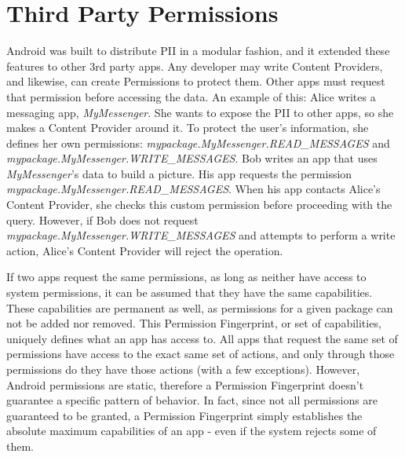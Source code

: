 \section{Third Party Permissions}
\begin{sloppypar}
Android was built to distribute PII in a modular fashion, and it extended these features to other 3rd party apps. Any developer may write Content Providers, and likewise, can create Permissions to protect them. Other apps must request that permission before accessing the data. An example of this: Alice writes a messaging app, \textit{MyMessenger}. She wants to expose the PII to other apps, so she makes a Content Provider around it. To protect the user's information, she defines her own permissions: \textit{mypackage.MyMessenger.READ\_MESSAGES} and \textit{mypackage.MyMessenger.WRITE\_MESSAGES}. Bob writes an app that uses \textit{MyMessenger}'s data to build a picture. His app requests the permission \textit{mypackage.MyMessenger.READ\_MESSAGES}. When his app contacts Alice's Content Provider, she checks this custom permission before proceeding with the query. However, if Bob does not request \textit{mypackage.MyMessenger.WRITE\_MESSAGES} and attempts to perform a write action, Alice's Content Provider will reject the operation.
\end{sloppypar}


If two apps request the same permissions, as long as neither have access to system permissions, it can be assumed that they have the same capabilities. These capabilities are permanent as well, as permissions for a given package can not be added nor removed. This Permission Fingerprint, or set of capabilities, uniquely defines what an app has access to. All apps that request the same set of permissions have access to the exact same set of actions, and only through those permissions do they have those actions (with a few exceptions). However, Android permissions are static, therefore a Permission Fingerprint doesn't guarantee a specific pattern of behavior. In fact, since not all permissions are guaranteed to be granted, a Permission Fingerprint simply establishes the absolute maximum capabilities of an app - even if the system rejects some of them.
